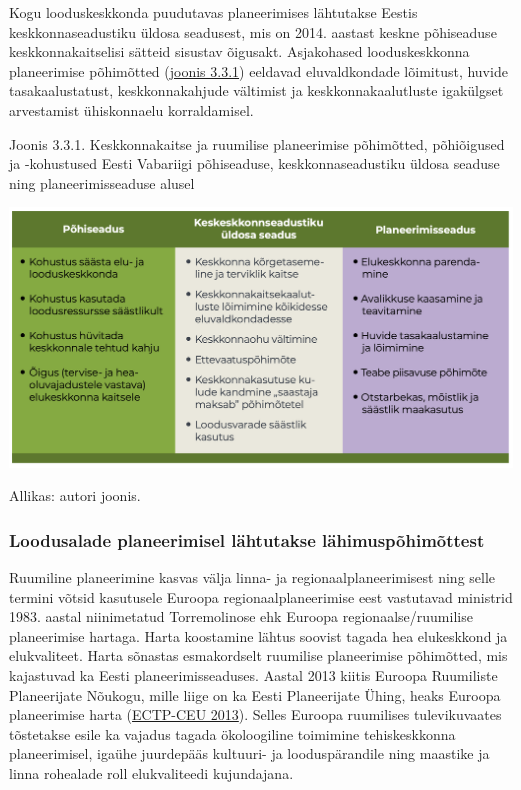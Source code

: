 \documentclass[estonian,]{article}
\begin{document}
Kogu looduskeskkonda puudutavas planeerimises lähtutakse Eestis keskkonnaseadustiku üldosa seadusest, mis on 2014. aastast keskne põhiseaduse keskkonnakaitselisi sätteid sisustav õigusakt. Asjakohased looduskeskkonna planeerimise põhimõtted (\protect\hyperlink{figure331}{joonis 3.3.1}) eeldavad eluvaldkondade lõimitust, huvide tasakaalustatust, keskkonnakahjude vältimist ja keskkonnakaalutluste igakülgset arvestamist ühiskonnaelu korraldamisel.

{Joonis 3.3.1.} Keskkonnakaitse ja ruumilise planeerimise põhimõtted, põhiõigused ja -kohustused Eesti Vabariigi põhiseaduse, keskkonnaseadustiku üldosa seaduse ning planeerimisseaduse alusel

\begin{center}\includegraphics[width=0.9\linewidth]{figures/3-chapter/fig331} \end{center}

\begin{imgsource}
{Allikas:} autori joonis.
\end{imgsource}

\hypertarget{loodusalade-planeerimisel-luxe4htutakse-luxe4himuspuxf5himuxf5ttest}{%
\subsubsection*{Loodusalade planeerimisel lähtutakse lähimuspõhimõttest}\label{loodusalade-planeerimisel-luxe4htutakse-luxe4himuspuxf5himuxf5ttest}}

Ruumiline planeerimine kasvas välja linna- ja regionaalplaneerimisest ning selle termini võtsid kasutusele Euroopa regionaalplaneerimise eest vastutavad ministrid 1983. aastal niinimetatud Torremolinose ehk Euroopa regionaalse/ruumilise planeerimise hartaga. Harta koostamine lähtus soovist tagada hea elukeskkond ja elukvaliteet. Harta sõnastas esmakordselt ruumilise planeerimise põhimõtted, mis kajastuvad ka Eesti planeerimisseaduses. Aastal 2013 kiitis Euroopa Ruumiliste Planeerijate Nõukogu, mille liige on ka Eesti Planeerijate Ühing, heaks Euroopa planeerimise harta (\protect\hyperlink{ECTP-CEU2013}{ECTP-CEU 2013}). Selles Euroopa ruumilises tulevikuvaates tõstetakse esile ka vajadus tagada ökoloogiline toimimine tehiskeskkonna planeerimisel, igaühe juurdepääs kultuuri- ja looduspärandile ning maastike ja linna rohealade roll elukvaliteedi kujundajana.
\end{document}
